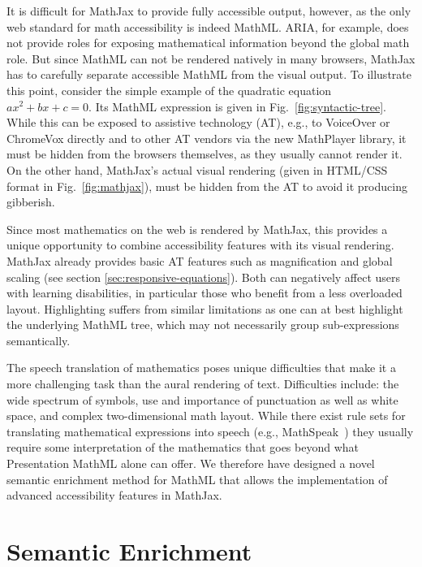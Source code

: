 \documentclass[conference]{IEEEtran}
\begin{document}
It is difficult for MathJax to provide fully accessible output, however, as the
only web standard for math accessibility is indeed MathML. ARIA, for example,
does not provide roles for exposing mathematical information beyond the global
math role.  But since MathML can not be rendered natively in many browsers,
MathJax has to carefully separate accessible MathML from the visual output.  To
illustrate this point, consider the simple example of the quadratic equation
\({ax^2+bx+c=0}\).
Its MathML expression is given in Fig.~\ref{fig:syntactic-tree}. While this can
be exposed to assistive technology (AT), e.g., to VoiceOver or ChromeVox
directly and to other AT vendors via the new MathPlayer library, it must be
hidden from the browsers themselves, as they usually cannot render it. On the other hand,
MathJax's actual visual rendering (given in HTML/CSS format in
Fig.~\ref{fig:mathjax}), must be hidden from the AT to avoid it producing
gibberish.

Since most mathematics on the web is rendered by MathJax, this provides a unique
opportunity to combine accessibility features with its visual rendering.
MathJax already provides basic AT features such as magnification and global
scaling (see section \ref{sec:responsive-equations}).  Both can negatively affect
users with learning disabilities, in particular those who benefit from a less
overloaded layout. Highlighting suffers from similar limitations as one can at
best highlight the underlying MathML tree, which may not necessarily group
sub-expressions semantically.

The speech translation of mathematics poses unique difficulties that make it a
more challenging task than the aural rendering of text. Difficulties
include:
the wide spectrum of symbols,
use and importance of punctuation as well as white space, and
complex two-dimensional math layout.
While there exist rule sets for
translating mathematical expressions into speech (e.g.,
MathSpeak~\cite{MathSpeak}) they usually require some interpretation of the
mathematics that goes beyond what Presentation MathML alone can offer.  We
therefore have designed a novel semantic enrichment method for MathML that
allows the implementation of advanced accessibility features in
MathJax.

\section{Semantic Enrichment}
\label{sec:semantic-enrichment}
\end{document}
